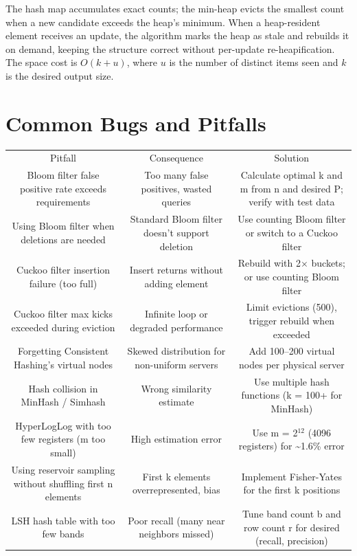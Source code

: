 The hash map accumulates exact counts; the min-heap evicts the smallest count
when a new candidate exceeds the heap's minimum.  When a heap-resident element
receives an update, the algorithm marks the heap as stale and rebuilds it on
demand, keeping the structure correct without per-update re-heapification.
The space cost is $O(k + u)$, where $u$ is the number of distinct items seen and
$k$ is the desired output size.

\section{Common Bugs and Pitfalls}

\begin{center}
\begin{tabular}{ccc}
\toprule
Pitfall & Consequence & Solution \\
Bloom filter false positive rate exceeds requirements & Too many false positives, wasted queries & Calculate optimal k and m from n and desired P; verify with test data \\
Using Bloom filter when deletions are needed & Standard Bloom filter doesn't support deletion & Use counting Bloom filter or switch to a Cuckoo filter \\
Cuckoo filter insertion failure (too full) & Insert returns without adding element & Rebuild with 2$\times $ buckets; or use counting Bloom filter \\
Cuckoo filter max kicks exceeded during eviction & Infinite loop or degraded performance & Limit evictions (500), trigger rebuild when exceeded \\
Forgetting Consistent Hashing's virtual nodes & Skewed distribution for non-uniform servers & Add 100–200 virtual nodes per physical server \\
Hash collision in MinHash / Simhash & Wrong similarity estimate & Use multiple hash functions (k = 100+ for MinHash) \\
HyperLogLog with too few registers (m too small) & High estimation error & Use m = 2$^{12}$ (4096 registers) for \textasciitilde{}1.6\% error \\
Using reservoir sampling without shuffling first n elements & First k elements overrepresented, bias & Implement Fisher-Yates for the first k positions \\
LSH hash table with too few bands & Poor recall (many near neighbors missed) & Tune band count b and row count r for desired (recall, precision) \\

\bottomrule
\end{tabular}
\end{center}
